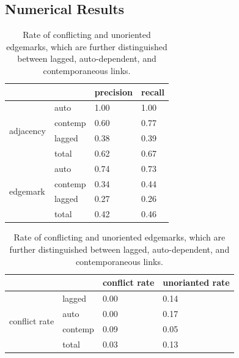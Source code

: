 \documentclass[conference]{IEEEtran}
\begin{document}
\subsection{Numerical Results}
\begin{table}[!htb]
    \caption{Numerical results}
    \begin{minipage}{.5\linewidth}
        \caption[]{precision and recall of edgemarks and adjacencies, which are further distinguished between lagged, auto-dependent, and contemporaneous links.}
      \centering
        \begin{tabular}{@{}llll@{}}
            \toprule
            \textbf{}                  &         & precision      & recall  \\ \midrule
            \multirow{4}{*}{adjacency} & auto    & 1.00             & 1.00       \\
                                       & contemp & 0.60             & 0.77       \\
                                       & lagged  & 0.38             & 0.39       \\
                                       & total   & 0.62             & 0.67       \\ \midrule
            \multirow{4}{*}{edgemark}  & auto    & 0.74             & 0.73       \\
                                       & contemp & 0.34             & 0.44       \\
                                       & lagged  & 0.27             & 0.26        \\
                                       & total   & 0.42             & 0.46       \\ \bottomrule
            \end{tabular}
            \label{tab:precision_recall}
    \end{minipage}%
    \begin{minipage}{.5\linewidth}
      \centering
            \caption[]{Rate of conflicting and unoriented edgemarks, which are further distinguished between lagged, auto-dependent, and contemporaneous links.}
            \begin{tabular}{@{}llll@{}}
            \toprule
            \textbf{}                        &         & conflict rate    & unorianted rate  \\ \midrule
            \multirow{4}{*}{conflict rate}   & lagged  & 0.00               & 0.14                \\
                                             & auto    & 0.00               & 0.17                \\
                                             & contemp & 0.09               & 0.05                \\
                                             & total   & 0.03               & 0.13       \\ \bottomrule
            \end{tabular}
            \label{tab:conflict_unoriented}
    \end{minipage} 
\end{table}
\end{document}
